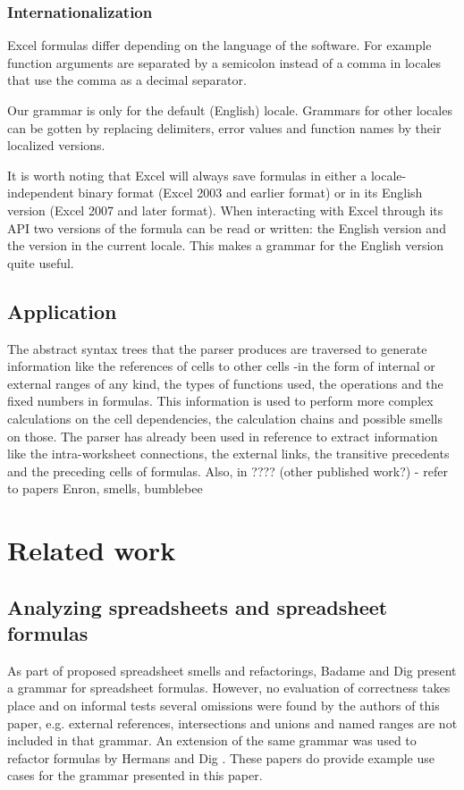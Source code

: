 \documentclass[conference]{IEEEtran}
\begin{document}
\subsubsection{Internationalization}

Excel formulas differ depending on the language of the software. For example function arguments are separated by a semicolon instead of a comma in locales that use the comma as a decimal separator.

Our grammar is only for the default (English) locale. Grammars for other locales can be gotten by replacing delimiters, error values and function names by their localized versions.

It is worth noting that Excel will always save formulas in either a locale-independent binary format (Excel 2003 and earlier format) or in its English version (Excel 2007 and later format). When interacting with Excel through its API two versions of the formula can be read or written: the English version and the version in the current locale.
This makes a grammar for the English version quite useful.

\subsection{Application}
The abstract syntax trees that the parser produces are traversed to generate information like the references of cells to other cells -in the form of internal or external ranges of any kind, the types of functions used, the operations and the fixed numbers in formulas. This information is used to perform more complex calculations on the cell dependencies, the calculation chains and possible smells on those. The parser has already been used in reference \cite{EnronVSEuses} to extract information like the intra-worksheet connections, the external links, the transitive precedents and the preceding cells of formulas. Also, in ???? (other published work?) - refer to papers Enron, smells, bumblebee

\section{Related work}
\label{section:relatedWork}

\subsection{Analyzing spreadsheets and spreadsheet formulas}

As part of proposed spreadsheet smells and refactorings, Badame and Dig \cite{badame2012refactoring} present a grammar for spreadsheet formulas.
However, no evaluation of correctness takes place and on informal tests several omissions were found by the authors of this paper, e.g. external references, intersections and unions and named ranges are not included in that grammar.
An extension of the same grammar was used to refactor formulas by Hermans and Dig \cite{hermans2014bumblebee}.
These papers do provide example use cases for the grammar presented in this paper.
\end{document}

